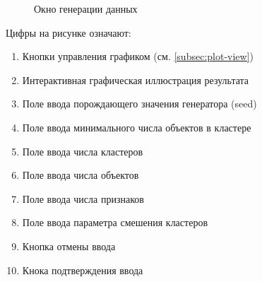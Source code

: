 \documentclass[12pt,tikz]{instruction}
\begin{document}
\begin{figure}[H]
	\centering
	\caption{Окно генерации данных}
	\label{fig:gen-data-dialog}
\end{figure}

Цифры на рисунке означают:
\begin{enumerate}
	\item Кнопки управления графиком (см. \ref{subsec:plot-view})
	\item Интерактивная графическая иллюстрация результата
	\item Поле ввода порождающего значения генератора (seed)
	\item Поле ввода минимального числа объектов в кластере
	\item Поле ввода числа кластеров
	\item Поле ввода числа объектов 
	\item Поле ввода числа признаков
	\item Поле ввода параметра смешения кластеров
	\item Кнопка отмены ввода
	\item Кнока подтверждения ввода
\end{enumerate}
\end{document}
